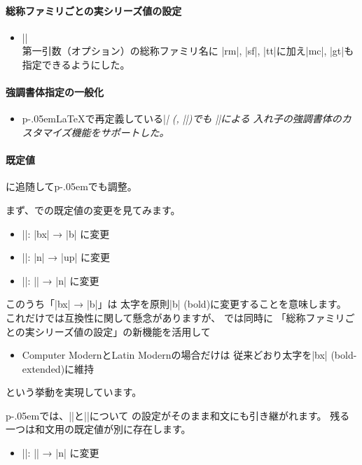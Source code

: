\documentclass{plnews}
\def\pLaTeX{p\kern-.05em\LaTeX}
\def\pLaTeXe{p\kern-.05em\LaTeXe}
\begin{document}
\paragraph{総称ファミリごとの実シリーズ値の設定}
\begin{itemize}
 \item |\DeclareFontSeriesDefault|\\
   第一引数（オプション）の総称ファミリ名に
   |rm|, |sf|, |tt|に加え|mc|, |gt|も指定できるようにした。
\end{itemize}

\paragraph{強調書体指定の一般化}
\begin{itemize}
 \item \pLaTeX{}で再定義している|\em| (, |\emph|)でも
   |\DeclareEmphSequence|による
   入れ子の強調書体のカスタマイズ機能をサポートした。
\end{itemize}

\paragraph{既定値}
\LaTeXe{}に追随して\pLaTeXe{}でも調整。

まず、\LaTeXe{}での既定値の変更を見てみます。
\begin{itemize}
 \item |\bfdefault|: |bx| → |b| に変更
 \item |\updefault|: |n| → |up| に変更
 \item |\shapedefault|: |\updefault| → |n| に変更
\end{itemize}
このうち「|bx| → |b|」は
太字を原則|b| (bold)に変更することを意味します。
これだけでは互換性に関して懸念がありますが、
\LaTeXe{}では同時に
「総称ファミリごとの実シリーズ値の設定」の新機能を活用して
\begin{itemize}
 \item Computer ModernとLatin Modernの場合だけは
   従来どおり太字を|bx| (bold-extended)に維持
\end{itemize}
という挙動を実現しています。

\pLaTeXe{}では、|\bfdefault|と|\updefault|について
\LaTeXe{}の設定がそのまま和文にも引き継がれます。
残る一つは和文用の既定値が別に存在します。
\begin{itemize}
 \item |\kanjishapedefault|: |\updefault| → |n| に変更
\end{itemize}
\end{document}
